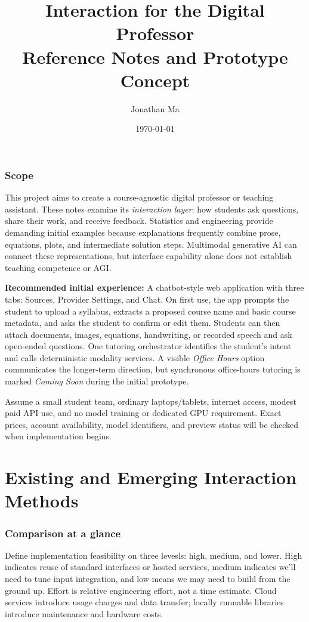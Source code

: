 \documentclass[11pt]{article}
\title{Interaction for the Digital Professor\\\large Reference Notes and Prototype Concept}
\author{Jonathan Ma}
\date{\today}
\begin{document}
\maketitle

\section{Scope}
This project aims to create a course-agnostic digital professor or teaching assistant. These notes examine its \emph{interaction layer}: how students ask questions, share their work, and receive feedback. Statistics and engineering provide demanding initial examples because explanations frequently combine prose, equations, plots, and intermediate solution steps. Multimodal generative AI can connect these representations, but interface capability alone does not establish teaching competence or AGI.

\textbf{Recommended initial experience:} A chatbot-style web application with three tabs: Sources, Provider Settings, and Chat. On first use, the app prompts the student to upload a syllabus, extracts a proposed course name and basic course metadata, and asks the student to confirm or edit them. Students can then attach documents, images, equations, handwriting, or recorded speech and ask open-ended questions. One tutoring orchestrator identifies the student's intent and calls deterministic modality services. A visible \emph{Office Hours} option communicates the longer-term direction, but synchronous office-hours tutoring is marked \emph{Coming Soon} during the initial prototype.

Assume a small student team, ordinary laptops/tablets, internet access, modest paid API use, and no model training or dedicated GPU requirement. Exact prices, account availability, model identifiers, and preview status will be checked when implementation begins. 

\part{Existing and Emerging Interaction Methods}

\section{Comparison at a glance}
Define implementation feasibility on three levesls: high, medium, and lower. High indicates reuse of standard interfaces or hosted services, medium indicates we'll need to tune input integration, and low means we may need to build from the ground up.  Effort is relative engineering effort, not a time estimate. Cloud services introduce usage charges and data transfer; locally runnable libraries introduce maintenance and hardware costs.
\end{document}
